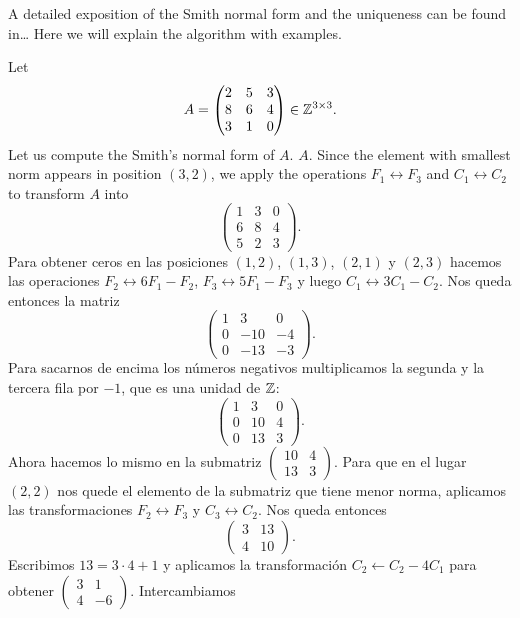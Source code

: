 A detailed exposition of the Smith normal form and the uniqueness can be found in\dots
Here we will explain the algorithm with examples. 

\begin{example}
Let 
\[
A=\begin{pmatrix}
	2 & 5 & 3\\
	8 & 6 & 4\\
	3 & 1 & 0
\end{pmatrix}\in\mathbb{Z}^{3\times3}.
\]	
Let us compute the Smith's normal form of $A$. $A$. 
Since the element with smallest norm appears in position $(3,2)$,
we apply the operations $F_1\leftrightarrow F_3$ and  $C_1\leftrightarrow C_2$ to transform $A$ into 
\[
\begin{pmatrix}
	1 & 3 & 0\\
	6 & 8 & 4\\
	5 & 2 & 3
\end{pmatrix}.
\]
Para obtener ceros en las posiciones $(1,2)$, $(1,3)$, $(2,1)$ y $(2,3)$ hacemos las operaciones
$F_2\leftrightarrow 6F_1-F_2$, $F_3\leftrightarrow 5F_1-F_3$ y luego 
$C_1\leftrightarrow 3C_1-C_2$. Nos queda entonces la matriz  
\[
\begin{pmatrix}
	1 & 3 & 0\\
	0 & -10 & -4\\
	0 & -13 & -3
\end{pmatrix}.
\]
Para sacarnos de encima los números negativos multiplicamos la segunda y la tercera fila por $-1$, que es una unidad de $\mathbb{Z}$:
\[
\begin{pmatrix}
	1 & 3 & 0\\
	0 & 10 & 4\\
	0 & 13 & 3
\end{pmatrix}.
\]
Ahora hacemos lo mismo en la submatriz $\begin{pmatrix}10&4\\13&3\end{pmatrix}$. Para que en el lugar $(2,2)$ nos
quede el elemento de la submatriz que tiene menor norma, aplicamos las transformaciones $F_2\leftrightarrow F_3$ y
$C_3\leftrightarrow C_2$. Nos queda entonces
\[ 
\begin{pmatrix}
3 & 13\\
4 & 10
\end{pmatrix}.
\]
Escribimos $13=3\cdot 4+1$ y aplicamos
la transformación $C_2\leftarrow C_2-4C_1$ para obtener $\begin{pmatrix}3&1\\4&-6\end{pmatrix}$. Intercambiamos 

\end{example}

